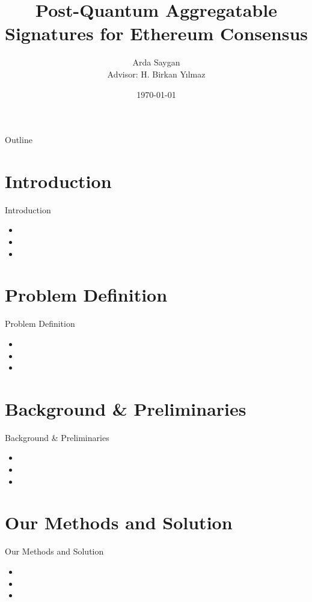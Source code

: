 \documentclass{beamer}
\title[PQ Aggregate Signatures for Ethereum]{Post-Quantum Aggregatable Signatures for Ethereum Consensus}
\author[A. Saygan]{Arda Saygan \\ \vspace{0.5cm} Advisor: H. Birkan Yılmaz}
\institute[BOUN]{Boğaziçi University \\ Department of Computer Engineering}
\date{\today}
\begin{document}
\begin{frame}
    \titlepage
\end{frame}

\begin{frame}{Outline}
    \tableofcontents
\end{frame}

\section{Introduction}
\begin{frame}{Introduction}
    \begin{itemize}
        \item 
        \item 
        \item 
    \end{itemize}
\end{frame}

\section{Problem Definition}
\begin{frame}{Problem Definition}
    \begin{itemize}
        \item 
        \item 
        \item 
    \end{itemize}
\end{frame}

\section{Background \& Preliminaries}
\begin{frame}{Background \& Preliminaries}
    \begin{itemize}
        \item 
        \item 
        \item 
    \end{itemize}
\end{frame}

\section{Our Methods and Solution}
\begin{frame}{Our Methods and Solution}
    \begin{itemize}
        \item 
        \item 
        \item 
    \end{itemize}
\end{frame}
\end{document}
